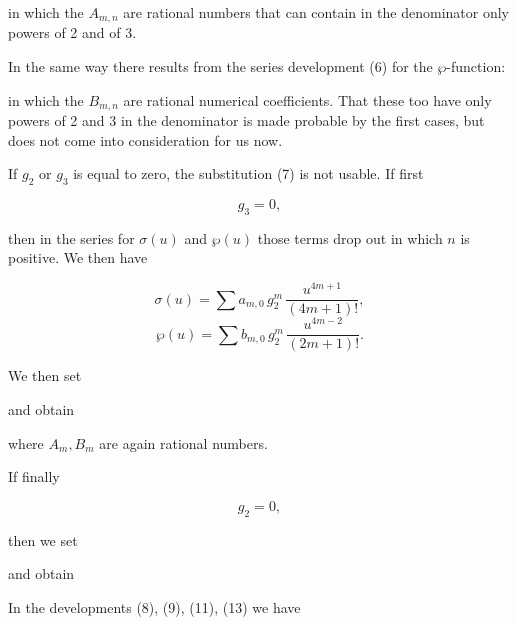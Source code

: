 
in which the $A_{m,n}$ are rational numbers that can contain in the
denominator only powers of 2 and of 3.

In the same way there results from the series development (6) for
the $\wp$-function:


in which the $B_{m,n}$ are rational numerical coefficients. That these
too have only powers of 2 and 3 in the denominator is made probable by
the first cases, but does not come into consideration for us now.

If $g_2$ or $g_3$ is equal to zero, the substitution (7) is not
usable. If first

\[
g_3 = 0,
\]

then in the series for $\sigma(u)$ and $\wp(u)$ those terms drop out
in which $n$ is positive. We then have

\[
\sigma(u) = \sum a_{m,0}\, g_2^m\, \frac{u^{4m+1}}{(4m+1)!},
\]
\[
\wp(u) = \sum b_{m,0}\, g_2^m\, \frac{u^{4m-2}}{(2m+1)!}.
\]

We then set


and obtain


where $A_m, B_m$ are again rational numbers.

If finally

\[
g_2 = 0,
\]

then we set


and obtain


In the developments (8), (9), (11), (13) we have

